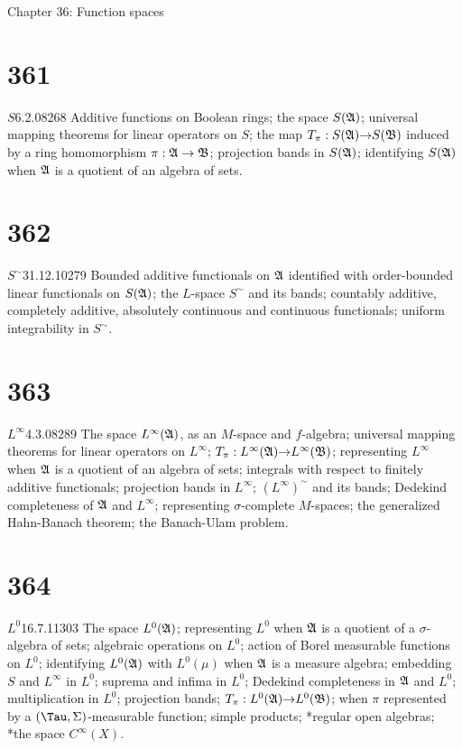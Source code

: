     
 Chapter 36:  Function spaces
     
     
\section{361}{$S$}{6.2.08}{268}{}
{Additive functions on Boolean rings;  the space $S(\frak{A})$;
universal mapping theorems for linear operators on $S$;  the map
$T_{\pi}:S(\frak{A}){\to}S(\frak{B})$ induced by a ring homomorphism
$\pi:\frak{A}\to\frak{B}$;  projection bands in $S(\frak{A})$;
identifying
$S(\frak{A})$ when $\frak{A}$ is a quotient of an algebra of sets.}
     
\section{362}{$S^{\sim}$}{31.12.10}{279}{}
{Bounded additive functionals on $\frak{A}$ identified with
order-bounded linear functionals on $S(\frak{A})$;   the $L$-space
$S^{\sim}$ and its bands;  countably additive, completely additive,
absolutely continuous and continuous functionals;  uniform integrability
in $S^{\sim}$.}
     
\section{363}{$L^{\infty}$}{4.3.08}{289}{}
{The space $L^{\infty}(\frak{A})$, as an $M$-space and $f$-algebra;
universal mapping theorems for linear operators on $L^{\infty}$;
$T_{\pi}:L^{\infty}(\frak{A}){\to}L^{\infty}(\frak{B})$;  representing
$L^{\infty}$ when $\frak{A}$ is a quotient of an algebra of sets;
integrals with respect to finitely additive functionals;
projection bands in $L^{\infty}$;  $(L^{\infty})^{\sim}$ and its bands;
Dedekind completeness of $\frak{A}$ and $L^{\infty}$;  representing
$\sigma$-complete $M$-spaces;   the generalized Hahn-Banach theorem;
the Banach-Ulam problem.}
     
\section{364}{$L^0$}{16.7.11}{303}{}
{The space $L^0(\frak{A})$;  representing $L^0$ when $\frak{A}$ is a
quotient of a $\sigma$-algebra of sets;  algebraic operations on
$L^0$;  action of Borel measurable functions on $L^0$;  identifying
$L^0(\frak{A})$ with $L^0(\mu)$ when $\frak{A}$ is a measure algebra;
embedding $S$ and $L^{\infty}$ in $L^0$;  suprema and infima in $L^0$;
Dedekind completeness in $\frak{A}$ and $L^0$;  multiplication in $L^0$;
projection bands;  $T_{\pi}:L^0(\frak{A}){\to}L^0(\frak{B})$;  
when $\pi$ represented by a $(\Tau,\Sigma)$-measurable function;  simple
products;  *regular open algebras;  *the space $C^{\infty}(X)$.}
     
